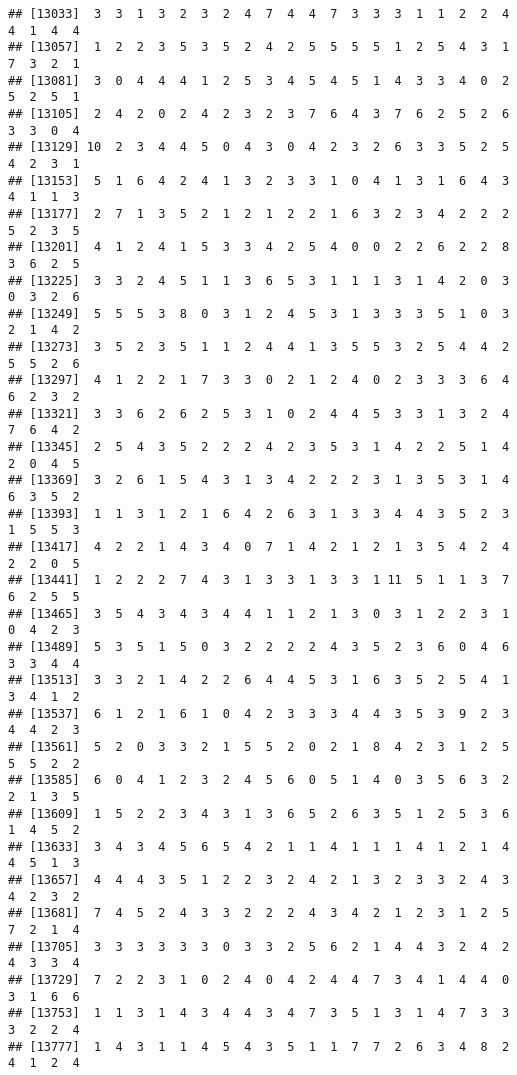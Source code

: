 \documentclass[
]{article}
\begin{document}
\begin{verbatim}
## [13033]  3  3  1  3  2  3  2  4  7  4  4  7  3  3  3  1  1  2  2  4  4  1  4  4
## [13057]  1  2  2  3  5  3  5  2  4  2  5  5  5  5  1  2  5  4  3  1  7  3  2  1
## [13081]  3  0  4  4  4  1  2  5  3  4  5  4  5  1  4  3  3  4  0  2  5  2  5  1
## [13105]  2  4  2  0  2  4  2  3  2  3  7  6  4  3  7  6  2  5  2  6  3  3  0  4
## [13129] 10  2  3  4  4  5  0  4  3  0  4  2  3  2  6  3  3  5  2  5  4  2  3  1
## [13153]  5  1  6  4  2  4  1  3  2  3  3  1  0  4  1  3  1  6  4  3  4  1  1  3
## [13177]  2  7  1  3  5  2  1  2  1  2  2  1  6  3  2  3  4  2  2  2  5  2  3  5
## [13201]  4  1  2  4  1  5  3  3  4  2  5  4  0  0  2  2  6  2  2  8  3  6  2  5
## [13225]  3  3  2  4  5  1  1  3  6  5  3  1  1  1  3  1  4  2  0  3  0  3  2  6
## [13249]  5  5  5  3  8  0  3  1  2  4  5  3  1  3  3  3  5  1  0  3  2  1  4  2
## [13273]  3  5  2  3  5  1  1  2  4  4  1  3  5  5  3  2  5  4  4  2  5  5  2  6
## [13297]  4  1  2  2  1  7  3  3  0  2  1  2  4  0  2  3  3  3  6  4  6  2  3  2
## [13321]  3  3  6  2  6  2  5  3  1  0  2  4  4  5  3  3  1  3  2  4  7  6  4  2
## [13345]  2  5  4  3  5  2  2  2  4  2  3  5  3  1  4  2  2  5  1  4  2  0  4  5
## [13369]  3  2  6  1  5  4  3  1  3  4  2  2  2  3  1  3  5  3  1  4  6  3  5  2
## [13393]  1  1  3  1  2  1  6  4  2  6  3  1  3  3  4  4  3  5  2  3  1  5  5  3
## [13417]  4  2  2  1  4  3  4  0  7  1  4  2  1  2  1  3  5  4  2  4  2  2  0  5
## [13441]  1  2  2  2  7  4  3  1  3  3  1  3  3  1 11  5  1  1  3  7  6  2  5  5
## [13465]  3  5  4  3  4  3  4  4  1  1  2  1  3  0  3  1  2  2  3  1  0  4  2  3
## [13489]  5  3  5  1  5  0  3  2  2  2  2  4  3  5  2  3  6  0  4  6  3  3  4  4
## [13513]  3  3  2  1  4  2  2  6  4  4  5  3  1  6  3  5  2  5  4  1  3  4  1  2
## [13537]  6  1  2  1  6  1  0  4  2  3  3  3  4  4  3  5  3  9  2  3  4  4  2  3
## [13561]  5  2  0  3  3  2  1  5  5  2  0  2  1  8  4  2  3  1  2  5  5  5  2  2
## [13585]  6  0  4  1  2  3  2  4  5  6  0  5  1  4  0  3  5  6  3  2  2  1  3  5
## [13609]  1  5  2  2  3  4  3  1  3  6  5  2  6  3  5  1  2  5  3  6  1  4  5  2
## [13633]  3  4  3  4  5  6  5  4  2  1  1  4  1  1  1  4  1  2  1  4  4  5  1  3
## [13657]  4  4  4  3  5  1  2  2  3  2  4  2  1  3  2  3  3  2  4  3  4  2  3  2
## [13681]  7  4  5  2  4  3  3  2  2  2  4  3  4  2  1  2  3  1  2  5  7  2  1  4
## [13705]  3  3  3  3  3  3  0  3  3  2  5  6  2  1  4  4  3  2  4  2  4  3  3  4
## [13729]  7  2  2  3  1  0  2  4  0  4  2  4  4  7  3  4  1  4  4  0  3  1  6  6
## [13753]  1  1  3  1  4  3  4  4  3  4  7  3  5  1  3  1  4  7  3  3  3  2  2  4
## [13777]  1  4  3  1  1  4  5  4  3  5  1  1  7  7  2  6  3  4  8  2  4  1  2  4

\end{verbatim}
\end{document}
